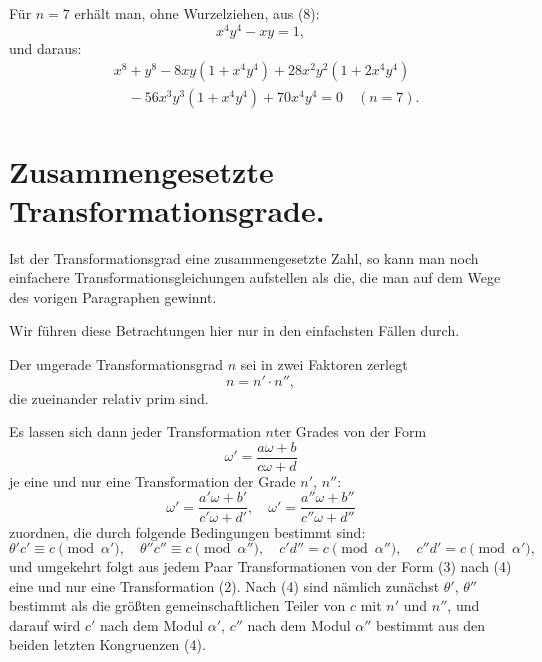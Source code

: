 \documentclass[12pt,a4paper]{article}
\theoremstyle{definition}
\begin{document}
Für $n = 7$ erhält man, ohne Wurzelziehen, aus (8):
\begin{equation}\label{eq:75-23}
x^4 y^4 - xy = 1,
\end{equation}
und daraus:
\begin{equation}\label{eq:75-24}
\begin{aligned}
&x^8 + y^8 - 8xy(1 + x^4 y^4) + 28x^2 y^2 (1 + 2x^4 y^4) \\
&\quad - 56x^3 y^3 (1 + x^4 y^4) + 70x^4 y^4 = 0 \quad (n = 7).
\end{aligned}
\end{equation}


\section{Zusammengesetzte Transformationsgrade.}\label{sec:76}

Ist der Transformationsgrad eine zusammengesetzte Zahl, so kann man noch einfachere Transformationsgleichungen aufstellen als die, die man auf dem Wege des vorigen Paragraphen gewinnt.

Wir führen diese Betrachtungen hier nur in den einfachsten Fällen durch.

Der ungerade Transformationsgrad $n$ sei in zwei Faktoren zerlegt
\begin{equation}\label{eq:76-1}
n = n' \cdot n'',
\end{equation}
die zueinander relativ prim sind.

Es lassen sich dann jeder Transformation $n$ter Grades von der Form
\begin{equation}\label{eq:76-2}
\omega' = \frac{a\omega + b}{c\omega + d}
\end{equation}
je eine und nur eine Transformation der Grade $n'$, $n''$:
\begin{equation}\label{eq:76-3}
\omega' = \frac{a'\omega + b'}{c'\omega + d'}, \quad \omega' = \frac{a''\omega + b''}{c''\omega + d''}
\end{equation}
zuordnen, die durch folgende Bedingungen bestimmt sind:
\begin{equation}\label{eq:76-4}
\theta' c' \equiv c \pmod{\alpha'}, \quad \theta'' c'' \equiv c \pmod{\alpha''}, \quad c'd'' = c \pmod{\alpha''}, \quad c''d' = c \pmod{\alpha'},
\end{equation}
und umgekehrt folgt aus jedem Paar Transformationen von der Form (3) nach (4) eine und nur eine Transformation (2). Nach (4) sind nämlich zunächst $\theta'$, $\theta''$ bestimmt als die größten gemeinschaftlichen Teiler von $c$ mit $n'$ und $n''$, und darauf wird $c'$ nach dem Modul $\alpha'$, $c''$ nach dem Modul $\alpha''$ bestimmt aus den beiden letzten Kongruenzen (4).
\end{document}
